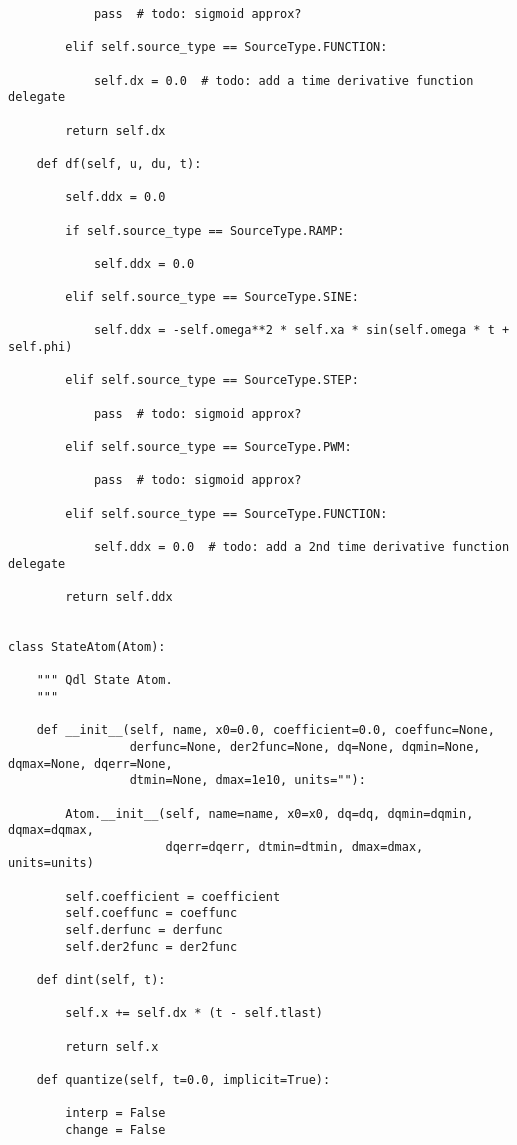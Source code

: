 \begin{lstlisting}
            pass  # todo: sigmoid approx?

        elif self.source_type == SourceType.FUNCTION:

            self.dx = 0.0  # todo: add a time derivative function delegate

        return self.dx

    def df(self, u, du, t):

        self.ddx = 0.0

        if self.source_type == SourceType.RAMP:

            self.ddx = 0.0

        elif self.source_type == SourceType.SINE:

            self.ddx = -self.omega**2 * self.xa * sin(self.omega * t + self.phi)

        elif self.source_type == SourceType.STEP:

            pass  # todo: sigmoid approx?

        elif self.source_type == SourceType.PWM:

            pass  # todo: sigmoid approx?

        elif self.source_type == SourceType.FUNCTION:

            self.ddx = 0.0  # todo: add a 2nd time derivative function delegate

        return self.ddx


class StateAtom(Atom):

    """ Qdl State Atom.
    """

    def __init__(self, name, x0=0.0, coefficient=0.0, coeffunc=None,
                 derfunc=None, der2func=None, dq=None, dqmin=None, dqmax=None, dqerr=None,
                 dtmin=None, dmax=1e10, units=""):

        Atom.__init__(self, name=name, x0=x0, dq=dq, dqmin=dqmin, dqmax=dqmax,
                      dqerr=dqerr, dtmin=dtmin, dmax=dmax, units=units)

        self.coefficient = coefficient
        self.coeffunc = coeffunc
        self.derfunc = derfunc
        self.der2func = der2func

    def dint(self, t):

        self.x += self.dx * (t - self.tlast)

        return self.x

    def quantize(self, t=0.0, implicit=True):

        interp = False
        change = False


\end{lstlisting}
